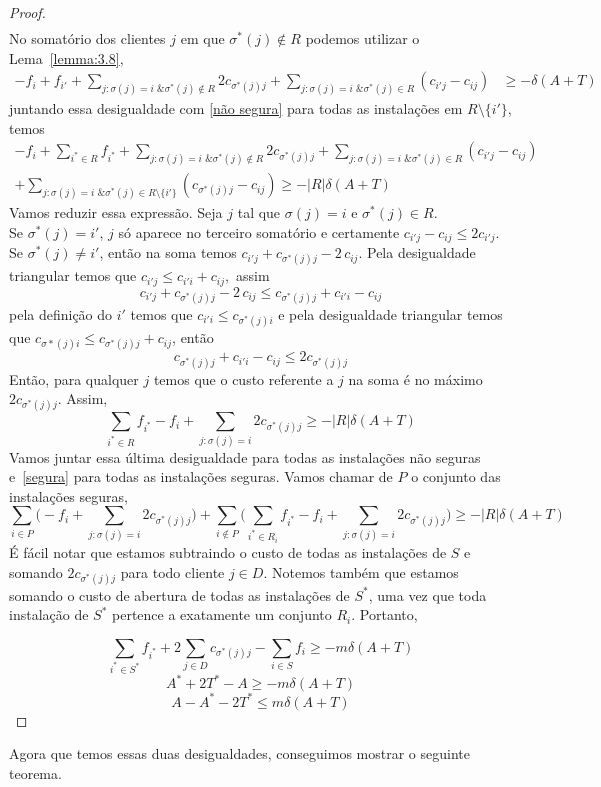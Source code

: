 \documentclass[12pt]{article}
\begin{document}
\begin{proof}
\begin{align*}
    \end{align*}
    No somatório dos clientes $j$ em que $\sigma^*(j) \not \in R$ podemos utilizar o Lema~\ref{lemma:3.8},
    \begin{align*}
        - f_i + f_{i'} + \sum_{j: \sigma(j) = i \text{ \& } \sigma^*(j)\not \in R} 2c_{\sigma^*(j)j} + \sum_{j: \sigma(j)=i \text{ \& }\sigma^*(j) \in R}(c_{i'j} - c_{ij}) &\geq -\delta(A+T)
    \end{align*}
    juntando essa desigualdade com \ref{não segura} para todas as instalações em $R\setminus\{i'\}$, temos
    \begin{align*}
        -f_i + \sum_{i^* \in R}f_{i^*} + \sum_{j: \sigma(j) = i \text{ \& } \sigma^*(j)\not \in R} 2c_{\sigma^*(j)j} + \sum_{j: \sigma(j)=i \text{ \& }\sigma^*(j) \in R}(c_{i'j} - c_{ij}) \\+ \sum_{j:\sigma(j)=i \text{ \& }\sigma^*(j) \in R \setminus\{i'\}}(c_{\sigma^*(j)j} - c_{ij}) \geq -|R|\delta(A+T)
    \end{align*}
    Vamos reduzir essa expressão. Seja $j$ tal que $\sigma(j)=i$ e $\sigma^*(j) \in R$. \\
    Se $\sigma^*(j) = i'$, $j$ só aparece no terceiro somatório e certamente $c_{i'j} - c_{ij} \leq 2 c_{i'j}$. \\
    Se $\sigma^*(j)\neq i'$, então na soma temos $c_{i'j} + c_{\sigma^*(j)j} - 2 \,c_{ij}$. Pela desigualdade triangular temos que $c_{i'j} \leq c_{i'i} + c_{ij},$ assim
    \[c_{i'j} + c_{\sigma^*(j)j} - 2 \,c_{ij} \leq c_{\sigma^*(j)j} + c_{i'i} - c_{ij} \]
    pela definição do $i'$ temos que $c_{i'i} \leq  c_{\sigma^*(j)i}$ e pela desigualdade triangular temos que $c_{\sigma*(j)i} \leq c_{\sigma^*(j)j} + c_{ij}$, então
    \[ c_{\sigma^*(j)j} + c_{i'i} -  c_{ij} \leq 2 c_{\sigma^*(j)j}\]
    Então, para qualquer $j$ temos que o custo referente a $j$ na soma é no máximo $2c_{\sigma^*(j)j}$. Assim,
    \[\sum_{i^* \in R}f_{i^*} - f_i + \sum_{j: \sigma(j)= i } 2c_{\sigma^*(j)j} \geq - |R| \delta(A+T)\]
    Vamos juntar essa última desigualdade para todas as instalações não seguras e~\ref{segura} para todas as instalações seguras. Vamos chamar de $P$ o conjunto das instalações seguras,
    \[\sum_{i \in P}\Big( - f_i + \sum_{j:\sigma(j) = i} 2c_{\sigma^*(j)j}\Big) + \sum_{i \not \in P}\Big( \sum_{i^* \in R_i}f_{i^*} - f_i + \sum_{j: \sigma(j)= i } 2c_{\sigma^*(j)j}\Big ) \geq - |R| \delta(A+T)   \]
    É fácil notar que estamos subtraindo o custo de todas as instalações de $S$ e somando $2c_{\sigma^*(j)j}$ para todo cliente $j\in D$. Notemos também que estamos somando o custo de abertura de todas as instalações de $S^*$, uma vez que toda instalação de $S^*$ pertence a exatamente um conjunto $R_i$. Portanto,
    
    \[\sum_{i^* \in S^*}f_{i^*} + 2 \sum_{j \in D} c_{\sigma^*(j)j} - \sum_{i \in S} f_i \geq -m \delta(A+T)\]
    \[A^* + 2 T^* - A \geq - m\delta(A+T)\]
    \[A - A^* - 2T^* \leq m\delta(A+T)\]
\end{proof}
Agora que temos essas duas desigualdades, conseguimos mostrar o seguinte teorema.
\end{document}
